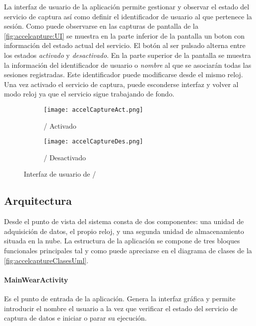 La interfaz de usuario de la aplicación permite gestionar y observar el estado del servicio de captura así como definir el identificador de usuario al que pertenece la sesión. Como puede observarse en las capturas de pantalla de la \autoref{fig:accelcapture:UI} se muestra en la parte inferior de la pantalla un boton con información del estado actual del servicio. El botón al ser pulsado alterna entre los estados \textit{activado} y \textit{desactivado}. En la parte superior de la pantalla se muestra la información del identificador de usuario o \textit{nombre} al que se asociarán todas las sesiones registradas. Este identificador puede modificarse desde el mismo reloj. Una vez activado el servicio de captura, puede esconderse interfaz y volver al modo reloj ya que el servicio sigue trabajando de fondo.
\begin{figure}[htb!]
  \centering
  \begin{subfigure}[b]{0.4\textwidth}
      \centering
      \texttt{[image: accelCaptureAct.png]}
      \caption{\accelcapture/ Activado}
      \label{fig:accelCapture:UI1}
  \end{subfigure}
  \hfill
  \begin{subfigure}[b]{0.4\textwidth}
      \centering
      \texttt{[image: accelCaptureDes.png]}
      \caption{\accelcapture/ Desactivado}
      \label{fig:accelCapture:UI2}
  \end{subfigure}
  \caption{\label{fig:accelcapture:UI} Interfaz de usuario de \accelcapture/}
\end{figure}


\subsection{Arquitectura}\label{sub:accelcapture:archi}


Desde el punto de vista del sistema consta de dos componentes: una unidad de adquisición de datos, el propio reloj, y una segunda unidad de almacenamiento situada en la nube. La estructura de la aplicación se compone de tres bloques funcionales principales tal y como puede apreciarse en el diagrama de clases de la \autoref{fig:accelcaptureClasesUml}.



\paragraph{MainWearActivity}
Es el punto de entrada de la aplicación. Genera la interfaz gráfica y permite introducir el nombre el usuario a la vez que verificar el estado del servicio de captura de datos e iniciar o parar su ejecución.

